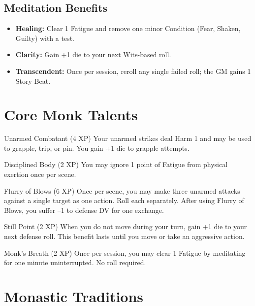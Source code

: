 \documentclass[9pt,a5paper]{extbook}
\begin{document}
\subsection*{Meditation Benefits}
\begin{itemize}
    \item \textbf{Healing:} Clear 1 Fatigue and remove one minor Condition (Fear, Shaken, Guilty) with a test.
    \item \textbf{Clarity:} Gain +1 die to your next Wits-based roll.
    \item \textbf{Transcendent:} Once per session, reroll any single failed roll; the GM gains 1 Story Beat.
\end{itemize}

\section{Core Monk Talents}

\begin{talentbox}{Unarmed Combatant (4 XP)}
Your unarmed strikes deal Harm 1 and may be used to grapple, trip, or pin. You gain +1 die to grapple attempts.
\end{talentbox}

\begin{talentbox}{Disciplined Body (2 XP)}
You may ignore 1 point of Fatigue from physical exertion once per scene.
\end{talentbox}

\begin{talentbox}{Flurry of Blows (6 XP)}
Once per scene, you may make three unarmed attacks against a single target as one action. Roll each separately. After using Flurry of Blows, you suffer --1 to defense DV for one exchange.
\end{talentbox}

\begin{talentbox}{Still Point (2 XP)}
When you do not move during your turn, gain +1 die to your next defense roll. This benefit lasts until you move or take an aggressive action.
\end{talentbox}

\begin{talentbox}{Monk's Breath (2 XP)}
Once per session, you may clear 1 Fatigue by meditating for one minute uninterrupted. No roll required.
\end{talentbox}

\section{Monastic Traditions}
\end{document}
